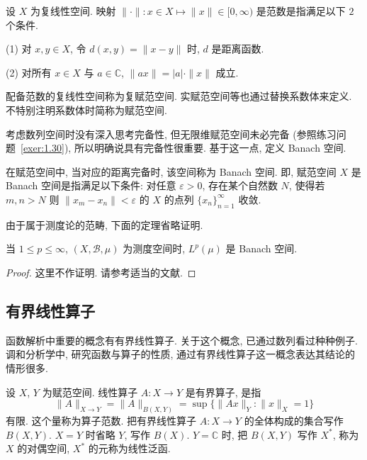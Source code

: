 \begin{definition}[赋范空间]\label{def:2.18}
设 $X$ 为复线性空间. 映射 $\|\cdot\|: x \in X \mapsto \|x\| \in [0, \infty)$ 是范数是指满足以下 $2$ 个条件.

(1) 对 $x, y \in X$, 令 $d(x, y) = \|x - y\|$ 时, $d$ 是距离函数.

(2) 对所有 $x \in X$ 与 $a \in \mathbb{C}$, $\|ax\| = |a|\cdot\|x\|$ 成立.
\end{definition}

配备范数的复线性空间称为复赋范空间. 实赋范空间等也通过替换系数体来定义. 不特别注明系数体时简称为赋范空间.

考虑数列空间时没有深入思考完备性, 但无限维赋范空间未必完备 (参照练习问题~\ref{exer:1.30}), 所以明确说具有完备性很重要. 基于这一点, 定义 Banach 空间.

\begin{definition}[Banach 空间]\label{def:2.19}
在赋范空间中, 当对应的距离完备时, 该空间称为 Banach 空间. 即, 赋范空间 $X$ 是 Banach 空间是指满足以下条件: 对任意 $\varepsilon > 0$, 存在某个自然数 $N$, 使得若 $m, n > N$ 则 $\|x_{m} - x_{n}\| < \varepsilon$ 的 $X$ 的点列 $\{x_{n}\}_{n=1}^{\infty}$ 收敛.
\end{definition}

由于属于测度论的范畴, 下面的定理省略证明.

\begin{theorem}\label{thm:2.21}
当 $1 \leq p \leq \infty$, $(X, \mathcal{B}, \mu)$ 为测度空间时, $L^{p}(\mu)$ 是 Banach 空间.
\end{theorem}

\begin{proof}
这里不作证明. 请参考适当的文献.
\end{proof}

\subsection*{有界线性算子}

函数解析中重要的概念有有界线性算子. 关于这个概念, 已通过数列看过种种例子. 调和分析学中, 研究函数与算子的性质, 通过有界线性算子这一概念表达其结论的情形很多.

\begin{definition}\label{def:2.20}
设 $X$, $Y$ 为赋范空间. 线性算子 $A: X \to Y$ 是有界算子, 是指
\[
\|A\|_{X \to Y} = \|A\|_{B(X, Y)} = \sup\{\|Ax\|_{Y} : \|x\|_{X} = 1\}
\]
有限. 这个量称为算子范数. 把有界线性算子 $A: X \to Y$ 的全体构成的集合写作 $B(X, Y)$. $X = Y$ 时省略 $Y$, 写作 $B(X)$. $Y = \mathbb{C}$ 时, 把 $B(X, Y)$ 写作 $X^{*}$, 称为 $X$ 的对偶空间, $X^{*}$ 的元称为线性泛函.
\end{definition}

